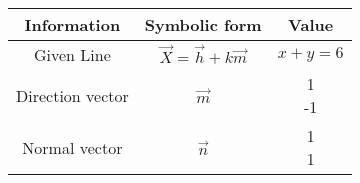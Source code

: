 \begin{tabular}[12pt]{|c|c|c|}
    \hline
	\textbf{Information} & \textbf{Symbolic form} & \textbf{Value}\\ 
    \hline
	Given Line & $\vec{X} = \vec{h}+k\vec{m}$ & $x+y=6$\\
    \hline 
	Direction vector & $\vec{m}$ & \myvec{1 \\ -1}\\
    \hline
	Normal vector & $\vec{n}$ & \myvec{1 \\ 1}\\
    \hline   
    \end{tabular}
